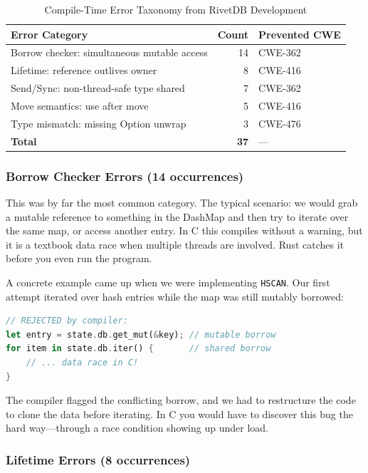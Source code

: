 \documentclass[conference,a4paper]{IEEEtran}
\begin{document}
\begin{table}[htbp]
\caption{Compile-Time Error Taxonomy from RivetDB Development}
\label{tab:error_taxonomy}
\centering
\begin{tabular}{@{}lrl@{}}
\toprule
\textbf{Error Category} & \textbf{Count} & \textbf{Prevented CWE} \\
\midrule
Borrow checker: simultaneous mutable access & 14 & CWE-362 \\
Lifetime: reference outlives owner & 8 & CWE-416 \\
Send/Sync: non-thread-safe type shared & 7 & CWE-362 \\
Move semantics: use after move & 5 & CWE-416 \\
Type mismatch: missing Option unwrap & 3 & CWE-476 \\
\midrule
\textbf{Total} & \textbf{37} & --- \\
\bottomrule
\end{tabular}
\end{table}

\subsubsection{Borrow Checker Errors (14 occurrences)}

This was by far the most common category. The typical scenario: we would grab a mutable reference to something in the DashMap and then try to iterate over the same map, or access another entry. In C this compiles without a warning, but it is a textbook data race when multiple threads are involved. Rust catches it before you even run the program.

A concrete example came up when we were implementing \texttt{HSCAN}. Our first attempt iterated over hash entries while the map was still mutably borrowed:

\begin{lstlisting}[language=Rust, basicstyle=\ttfamily\scriptsize]
// REJECTED by compiler:
let entry = state.db.get_mut(&key); // mutable borrow
for item in state.db.iter() {       // shared borrow
    // ... data race in C!
}
\end{lstlisting}

The compiler flagged the conflicting borrow, and we had to restructure the code to clone the data before iterating. In C you would have to discover this bug the hard way---through a race condition showing up under load.

\subsubsection{Lifetime Errors (8 occurrences)}
\end{document}
